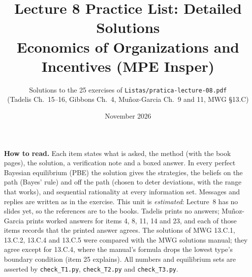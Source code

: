 \documentclass[11pt,a4paper]{article}
\title{\textbf{Lecture 8 Practice List: Detailed Solutions}\\[4pt]
  \large Economics of Organizations and Incentives (MPE Insper)}
\author{Solutions to the 25 exercises of \texttt{Listas/pratica-lecture-08.pdf}\\
  (Tadelis Ch.~15--16, Gibbons Ch.~4, Mu\~noz-Garcia Ch.~9 and 11, MWG \S13.C)}
\date{November 2026}
\begin{document}
\maketitle
\thispagestyle{empty}

\noindent\textbf{How to read.} Each item states what is asked, the method (with the book pages),
the solution, a verification note and a boxed answer. In every perfect Bayesian equilibrium (PBE)
the solution gives the strategies, the beliefs on the path (Bayes' rule) and off the path
(chosen to deter deviations, with the range that works), and sequential rationality at every
information set. Messages and replies are written as in the exercise. This unit is
\emph{estimated}: Lecture~8 has no slides yet, so the references are to the books. Tadelis
prints no answers; Mu\~noz-Garcia prints worked answers for items 4, 8, 11, 14 and 23, and each
of those items records that the printed answer agrees. The solutions of MWG 13.C.1, 13.C.2,
13.C.4 and 13.C.5 were compared with the MWG solutions manual; they agree except for 13.C.4, where
the manual's formula drops the lowest type's boundary condition (item 25 explains).
All numbers and equilibrium sets are asserted by \texttt{check\_T1.py}, \texttt{check\_T2.py}
and \texttt{check\_T3.py}.

\tableofcontents

\sollecture{\lectureviiititle}
\itemsviii
\end{document}
